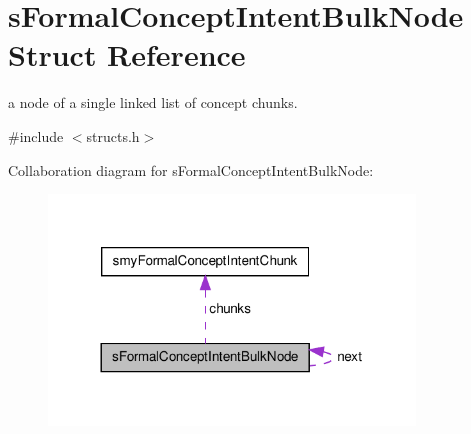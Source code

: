 \hypertarget{structsFormalConceptIntentBulkNode}{\section{s\-Formal\-Concept\-Intent\-Bulk\-Node \-Struct \-Reference}
\label{structsFormalConceptIntentBulkNode}
}


a node of a single linked list of concept chunks.  




{\ttfamily \#include $<$structs.\-h$>$}



\-Collaboration diagram for s\-Formal\-Concept\-Intent\-Bulk\-Node\-:\nopagebreak
\begin{figure}[H]
\begin{center}
\leavevmode
\includegraphics[width=276pt]{structsFormalConceptIntentBulkNode__coll__graph}
\end{center}
\end{figure}
